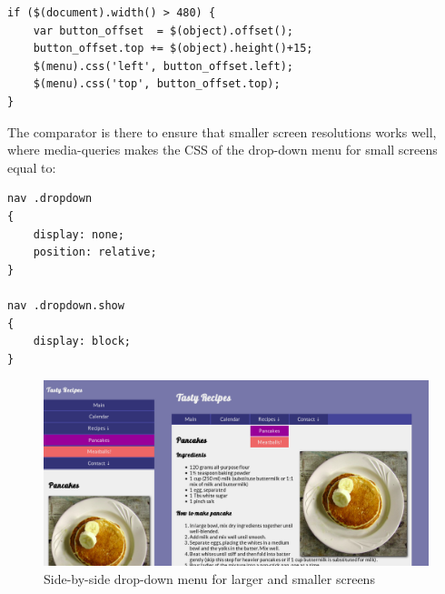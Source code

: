 \documentclass[a4paper]{scrartcl}
\begin{document}
\begin{lstlisting}
if ($(document).width() > 480) {                                    
	var button_offset  = $(object).offset();                        
	button_offset.top += $(object).height()+15;                     
	$(menu).css('left', button_offset.left);                        
	$(menu).css('top', button_offset.top);                          
}
\end{lstlisting}

The comparator is there to ensure that smaller screen resolutions works well, where media-queries makes the CSS of the drop-down menu for small screens equal to:

\begin{lstlisting}
nav .dropdown                                                               
{                                                                           
    display: none;                                                          
    position: relative;                                                     
}                                                                           
                                                                                
nav .dropdown.show                                                          
{                                                                           
    display: block;                                                         
}
\end{lstlisting}


\begin{figure}[!h]
  \begin{center}
    \includegraphics[scale=0.3]{dropdown_both.png}
    \caption{Side-by-side drop-down menu for larger and smaller screens}
    \label{fig:dropdown}
  \end{center}
\end{figure}
\end{document}
